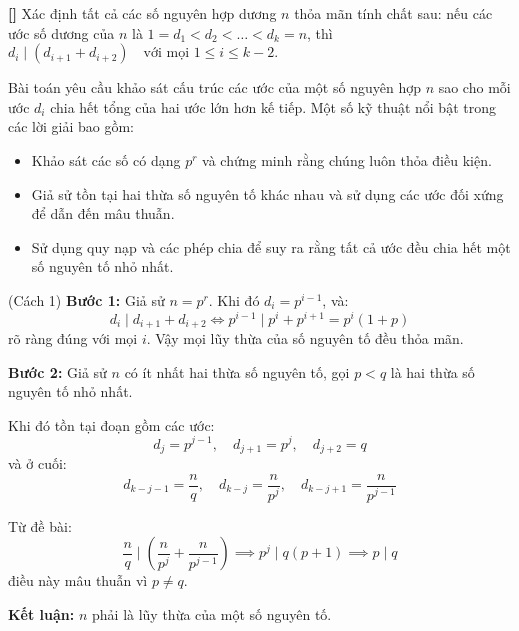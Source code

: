 \documentclass[../01-divisibility.tex]{subfiles}
\begin{document}
\begin{example*}\label{example:IMO-2023-P1}\textbf{[]}
    Xác định tất cả các số nguyên hợp dương \( n \) thỏa mãn tính chất sau: nếu các ước số dương của \( n \) là \( 1 = d_1 < d_2 < \dots < d_k = n \),
    thì \( d_i \mid (d_{i+1} + d_{i+2}) \quad \text{với mọi } 1 \leq i \leq k - 2. \)
\end{example*}

\begin{story*}
    Bài toán yêu cầu khảo sát cấu trúc các ước của một số nguyên hợp \( n \) sao cho mỗi ước \( d_i \) chia hết tổng của hai ước lớn hơn kế tiếp.
    Một số kỹ thuật nổi bật trong các lời giải bao gồm:
    \begin{itemize}[topsep=0pt, partopsep=0pt, itemsep=0pt]
        \item Khảo sát các số có dạng \( p^r \) và chứng minh rằng chúng luôn thỏa điều kiện.
        \item Giả sử tồn tại hai thừa số nguyên tố khác nhau và sử dụng các ước đối xứng để dẫn đến mâu thuẫn.
        \item Sử dụng quy nạp và các phép chia để suy ra rằng tất cả ước đều chia hết một số nguyên tố nhỏ nhất.
    \end{itemize}
\end{story*}

\bigbreak

\begin{soln}(Cách 1)\footnotemark
    \textbf{Bước 1:} Giả sử \( n = p^r \). Khi đó \( d_i = p^{i-1} \), và:
    \[
        d_i \mid d_{i+1} + d_{i+2} \Leftrightarrow p^{i-1} \mid p^i + p^{i+1} = p^i(1 + p)
    \]
    rõ ràng đúng với mọi \( i \). Vậy mọi lũy thừa của số nguyên tố đều thỏa mãn.

    \textbf{Bước 2:} Giả sử \( n \) có ít nhất hai thừa số nguyên tố, gọi \( p < q \) là hai thừa số nguyên tố nhỏ nhất.

    Khi đó tồn tại đoạn gồm các ước:
    \[
        d_j = p^{j-1},\quad d_{j+1} = p^j,\quad d_{j+2} = q
    \]
    và ở cuối:
    \[
        d_{k-j-1} = \frac{n}{q},\quad d_{k-j} = \frac{n}{p^j},\quad d_{k-j+1} = \frac{n}{p^{j-1}}
    \]

    Từ đề bài:
    \[
        \frac{n}{q} \mid \left( \frac{n}{p^j} + \frac{n}{p^{j-1}} \right) \implies p^j \mid q(p + 1) \implies p \mid q
    \]
    điều này mâu thuẫn vì \( p \neq q \).

    \textbf{Kết luận:} \( n \) phải là lũy thừa của một số nguyên tố.
\end{soln}
\end{document}
